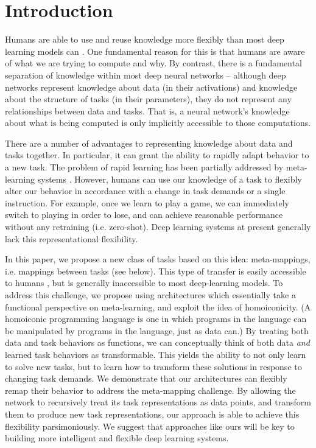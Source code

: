 \documentclass{article}
\begin{document}
\section{Introduction}
\vspace{-0.5em} %
Humans are able to use and reuse knowledge more flexibly than most deep learning models can \citep{Lake2016, Marcus2018}. One fundamental reason for this is that humans are aware of what we are trying to compute and why. By contrast, there is a fundamental separation of knowledge within most deep neural networks -- although deep networks represent knowledge about data (in their activations) and knowledge about the structure of tasks (in their parameters), they do not represent any relationships between data and tasks. That is, a neural network's knowledge about what is being computed is only implicitly accessible to those computations. \par
{}
There are a number of advantages to representing knowledge about data and tasks together. In particular, it can grant the ability to rapidly adapt behavior to a new task. The problem of rapid learning has been partially addressed by meta-learning systems \citep[see also section \ref{sec_discussion}]{Santoro2016, Finn2017a, Finn2018, Stadie2018, Botvinick2019}. However, humans can use our knowledge of a task to flexibly alter our behavior in accordance with a change in task demands or a single instruction. For example, once we learn to play a game, we can immediately switch to playing in order to lose, and can achieve reasonable performance without any retraining (i.e. zero-shot). Deep learning systems at present generally lack this representational flexibility. \par
In this paper, we propose a new class of tasks based on this idea: meta-mappings, i.e. mappings between tasks (see below). This type of transfer is easily accessible to humans \citep{Lake2016}, but is generally inaccessible to most deep-learning models. To address this challenge, we propose using architectures which essentially take a functional perspective on meta-learning, and exploit the idea of homoiconicity. (A homoiconic programming language is one in which programs in the language can be manipulated by programs in the language, just as data can.) By treating both data and task behaviors as functions, we can conceptually think of both data \emph{and} learned task behaviors as transformable. This yields the ability to not only learn to solve new tasks, but to learn how to transform these solutions in response to changing task demands. We demonstrate that our architectures can flexibly remap their behavior to address the meta-mapping challenge. By allowing the network to recursively treat its task representations as data points, and transform them to produce new task representations, our approach is able to achieve this flexibility parsimoniously. We suggest that approaches like ours will be key to building more intelligent and flexible deep learning systems. \par
\end{document}
